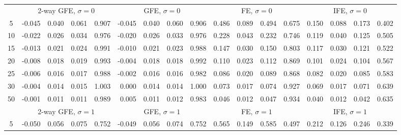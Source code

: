 \begin{tabular}{c r r r r r r r r r r r r r r r r}
 & \multicolumn{ 4 }{c}{ 2-way GFE, $\sigma{=}0$} & \multicolumn{ 4 }{c}{ GFE, $\sigma{=}0$} & \multicolumn{ 4 }{c}{ FE, $\sigma{=}0$} & \multicolumn{ 4 }{c}{ IFE, $\sigma{=}0$}\\[-3pt]
 \cmidrule(lr){2-5}  \cmidrule(lr){6-9}  \cmidrule(lr){10-13}  \cmidrule(lr){14-17}
5 &     -0.045 &      0.040 &      0.061 &      0.907 &     -0.045 &      0.040 &      0.060 &      0.906 &      0.486 &      0.089 &      0.494 &      0.675 &      0.150 &      0.088 &      0.173 &      0.402\\
10 &     -0.022 &      0.026 &      0.034 &      0.976 &     -0.020 &      0.026 &      0.033 &      0.976 &      0.228 &      0.043 &      0.232 &      0.746 &      0.119 &      0.040 &      0.125 &      0.505\\
15 &     -0.013 &      0.021 &      0.024 &      0.991 &     -0.010 &      0.021 &      0.023 &      0.988 &      0.147 &      0.030 &      0.150 &      0.803 &      0.117 &      0.030 &      0.121 &      0.522\\
20 &     -0.008 &      0.018 &      0.019 &      0.993 &     -0.004 &      0.018 &      0.018 &      0.992 &      0.110 &      0.023 &      0.112 &      0.869 &      0.101 &      0.024 &      0.104 &      0.567\\
25 &     -0.006 &      0.016 &      0.017 &      0.988 &     -0.002 &      0.016 &      0.016 &      0.982 &      0.086 &      0.020 &      0.089 &      0.868 &      0.082 &      0.020 &      0.085 &      0.583\\
30 &     -0.004 &      0.014 &      0.015 &      1.003 &      0.000 &      0.014 &      0.014 &      1.000 &      0.073 &      0.017 &      0.074 &      0.927 &      0.069 &      0.017 &      0.071 &      0.639\\
50 &     -0.001 &      0.011 &      0.011 &      0.989 &      0.005 &      0.011 &      0.012 &      0.983 &      0.046 &      0.012 &      0.047 &      0.934 &      0.040 &      0.012 &      0.042 &      0.635\\[0pt]
 & \multicolumn{ 4 }{c}{ 2-way GFE, $\sigma{=}1$} & \multicolumn{ 4 }{c}{ GFE, $\sigma{=}1$} & \multicolumn{ 4 }{c}{ FE, $\sigma{=}1$} & \multicolumn{ 4 }{c}{ IFE, $\sigma{=}1$}\\[-3pt]
 \cmidrule(lr){2-5}  \cmidrule(lr){6-9}  \cmidrule(lr){10-13}  \cmidrule(lr){14-17}
5 &     -0.050 &      0.056 &      0.075 &      0.752 &     -0.049 &      0.056 &      0.074 &      0.752 &      0.565 &      0.149 &      0.585 &      0.497 &      0.212 &      0.126 &      0.246 &      0.339\\

\end{tabular}
